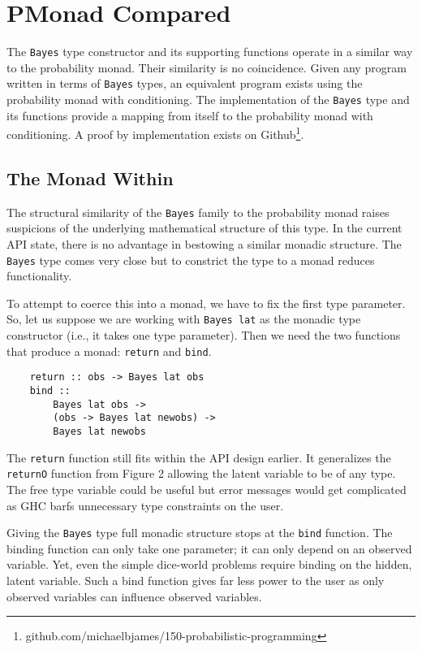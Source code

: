 \documentclass[9pt,twocolumn]{article}
\begin{document}
\section{PMonad Compared}
The \texttt{Bayes} type constructor and its supporting functions operate in a similar way to the probability monad. Their similarity is no coincidence. Given any program written in terms of \texttt{Bayes} types, an equivalent program exists using the probability monad with conditioning. The implementation of the \texttt{Bayes} type and its functions provide a mapping from itself to the probability monad with conditioning. A proof by implementation exists on Github\footnote{github.com/michaelbjames/150-probabilistic-programming}.

\subsection{The Monad Within}
The structural similarity of the \texttt{Bayes} family to the probability monad raises suspicions of the underlying mathematical structure of this type. In the current API state, there is no advantage in bestowing a similar monadic structure. The \texttt{Bayes} type comes very close but to constrict the type to a monad reduces functionality.

To attempt to coerce this into a monad, we have to fix the first type parameter. So, let us suppose we are working with \texttt{Bayes lat} as the monadic type constructor (i.e., it takes one type parameter). Then we need the two functions that produce a monad: \texttt{return} and \texttt{bind}.
\begin{verbatim}
    return :: obs -> Bayes lat obs
    bind ::
        Bayes lat obs ->
        (obs -> Bayes lat newobs) ->
        Bayes lat newobs
\end{verbatim}
The \texttt{return} function still fits within the API design earlier. It generalizes the \texttt{returnO} function from Figure 2 allowing the latent variable to be of any type. The free type variable could be useful but error messages would get complicated as GHC barfs unnecessary type constraints on the user.

Giving the \texttt{Bayes} type full monadic structure stops at the \texttt{bind} function. The binding function can only take one parameter; it can only depend on an observed variable. Yet, even the simple dice-world problems require binding on the hidden, latent variable. Such a bind function gives far less power to the user as only observed variables can influence observed variables.
\end{document}
